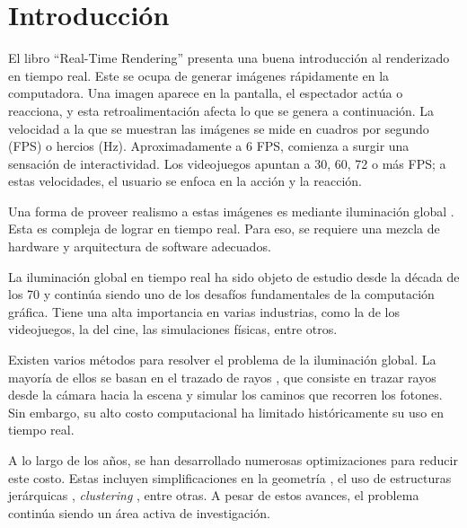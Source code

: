 \chapter{Introducción}


El libro ``Real-Time Rendering'' \cite[p.~1]{rtr} presenta una buena introducción al renderizado en tiempo real.
Este se ocupa de generar imágenes rápidamente en la computadora.
Una imagen aparece en la pantalla, el espectador actúa o reacciona, y esta retroalimentación afecta lo que se genera a continuación.
La velocidad a la que se muestran las imágenes se mide en cuadros por segundo (FPS) o hercios (Hz).
Aproximadamente a 6 FPS, comienza a surgir una sensación de interactividad.
Los videojuegos apuntan a 30, 60, 72 o más FPS; a estas velocidades, el usuario se enfoca en la acción y la reacción.

Una forma de proveer realismo a estas imágenes es mediante iluminación global \cite[p.~437]{rtr}.
Esta es compleja de lograr en tiempo real.
Para eso, se requiere una mezcla de hardware y arquitectura de software adecuados.

La iluminación global en tiempo real ha sido objeto de estudio desde la década de los 70 y continúa siendo uno de los desafíos fundamentales de la computación gráfica.
Tiene una alta importancia en varias industrias, como la de los videojuegos, la del cine, las simulaciones físicas, entre otros.

Existen varios métodos para resolver el problema de la iluminación global.
La mayoría de ellos se basan en el trazado de rayos \cite{whitted-1980}, que consiste en trazar rayos desde la cámara hacia la escena y simular los caminos que recorren los fotones.
Sin embargo, su alto costo computacional ha limitado históricamente su uso en tiempo real.

A lo largo de los años, se han desarrollado numerosas optimizaciones para reducir este costo.
Estas incluyen simplificaciones en la geometría \cite{gigavoxels}, el uso de estructuras jerárquicas \cite{real-time-photon-mapping}, \textit{clustering} \cite{faster-photon-mapping}, entre otras.
A pesar de estos avances, el problema continúa siendo un área activa de investigación.

